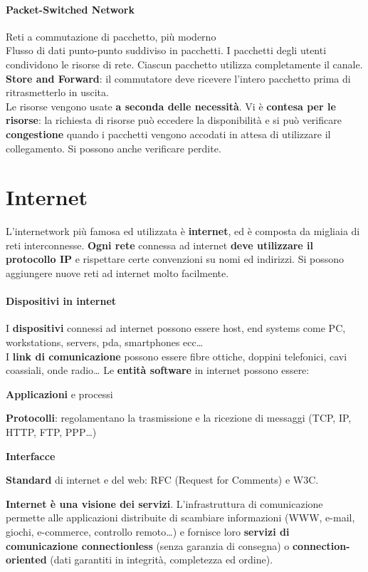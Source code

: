 \documentclass[10pt]{article}
\begin{document}
\paragraph{Packet-Switched Network} Reti a commutazione di pacchetto, più moderno\\
Flusso di dati punto-punto suddiviso in pacchetti. I pacchetti degli utenti condividono le risorse di rete. Ciascun pacchetto utilizza completamente il canale.\\\textbf{Store and Forward}: il commutatore deve ricevere l'intero pacchetto prima di ritrasmetterlo in uscita.\\Le risorse vengono usate \textbf{a seconda delle necessità}. Vi è \textbf{contesa per le risorse}: la richiesta di risorse può eccedere la disponibilità e si può verificare \textbf{congestione} quando i pacchetti vengono accodati in attesa di utilizzare il collegamento. Si possono anche verificare perdite.
\section{Internet} L'internetwork più famosa ed utilizzata è \textbf{internet}, ed è composta da migliaia di reti interconnesse. \textbf{Ogni rete} connessa ad internet \textbf{deve utilizzare il protocollo IP} e rispettare certe convenzioni su nomi ed indirizzi. Si possono aggiungere nuove reti ad internet molto facilmente.
\paragraph{Dispositivi in internet} I \textbf{dispositivi} connessi ad internet possono essere host, end systems come PC, workstations, servers, pda, smartphones ecc\ldots\\
I \textbf{link di comunicazione} possono essere fibre ottiche, doppini telefonici, cavi coassiali, onde radio\ldots
Le \textbf{entità software} in internet possono essere:
\begin{list}{}{}
\item \textbf{Applicazioni} e processi
\item \textbf{Protocolli}: regolamentano la trasmissione e la ricezione di messaggi (TCP, IP, HTTP, FTP, PPP\ldots)
\item \textbf{Interfacce}
\item \textbf{Standard} di internet e del web: RFC (Request for Comments) e W3C.
\end{list}
\textbf{Internet è una visione dei servizi}. L'infrastruttura di comunicazione permette alle applicazioni distribuite di scambiare informazioni (WWW, e-mail, giochi, e-commerce, controllo remoto\ldots) e fornisce loro \textbf{servizi di comunicazione connectionless} (senza garanzia di consegna) o \textbf{connection-oriented} (dati garantiti in integrità, completezza ed ordine).
\end{document}
